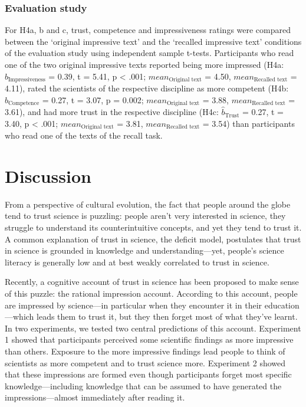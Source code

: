 \documentclass[
  english,
  doc,floatsintext]{apa6}
\begin{document}
\subsubsection{Evaluation study}\label{evaluation-study-1}

For H4a, b and c, trust, competence and impressiveness ratings were compared between the `original impressive text' and the `recalled impressive text' conditions of the evaluation study using independent sample t-tests. Participants who read one of the two original impressive texts reported being more impressed (H4a: \(\hat{b}_{\text{Impressiveness}}\) = 0.39, t = 5.41, p \textless{} .001; \(mean_{\text{Original text}}\) = 4.50, \(mean_{\text{Recalled text}}\) = 4.11), rated the scientists of the respective discipline as more competent (H4b: \(\hat{b}_{\text{Competence}}\) = 0.27, t = 3.07, p = 0.002; \(mean_{\text{Original text}}\) = 3.88, \(mean_{\text{Recalled text}}\) = 3.61), and had more trust in the respective discipline (H4c: \(\hat{b}_{\text{Trust}}\) = 0.27, t = 3.40, p \textless{} .001; \(mean_{\text{Original text}}\) = 3.81, \(mean_{\text{Recalled text}}\) = 3.54) than participants who read one of the texts of the recall task.

\section{Discussion}\label{discussion}

From a perspective of cultural evolution, the fact that people around the globe tend to trust science is puzzling: people aren't very interested in science, they struggle to understand its counterintuitive concepts, and yet they tend to trust it. A common explanation of trust in science, the deficit model, postulates that trust in science is grounded in knowledge and understanding---yet, people's science literacy is generally low and at best weakly correlated to trust in science.

Recently, a cognitive account of trust in science has been proposed to make sense of this puzzle: the rational impression account. According to this account, people are impressed by science---in particular when they encounter it in their education---which leads them to trust it, but they then forget most of what they've learnt. In two experiments, we tested two central predictions of this account. Experiment 1 showed that participants perceived some scientific findings as more impressive than others. Exposure to the more impressive findings lead people to think of scientists as more competent and to trust science more. Experiment 2 showed that these impressions are formed even though participants forget most specific knowledge---including knowledge that can be assumed to have generated the impressions---almost immediately after reading it.
\end{document}
